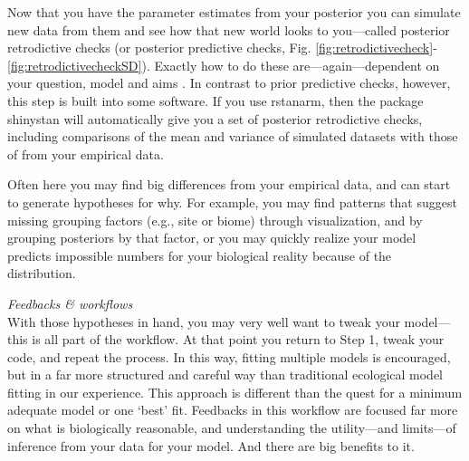 \documentclass[11pt]{article}
\begin{document}
{Now that you have the parameter estimates from your posterior you can simulate new data from them and see how that new world looks to you---called posterior retrodictive checks (or posterior predictive checks, Fig. \ref{fig:retrodictivecheck}-\ref{fig:retrodictivecheckSD}). Exactly how to do these are---again---dependent on your question, model and aims \citep[but there is lots written on this,][]{held2010,gelman200ppc,conn2018}. In contrast to prior predictive checks, however, this step is built into some software. If you use \textsf{rstanarm}, then the package \textsf{shinystan} will automatically give you a set of posterior retrodictive checks, including comparisons of the mean and variance of simulated datasets with those of from your empirical data. 

Often here you may find big differences from your empirical data, and can start to generate hypotheses for why. For example, you may find patterns that suggest missing grouping factors (e.g., site or biome) through visualization, and by grouping posteriors by that factor, or you may quickly realize your model predicts impossible numbers for your biological reality because of the distribution. 

\emph{Feedbacks \& workflows}\\
With those hypotheses in hand, you may very well want to tweak your model---this is all part of the workflow. At that point you return to Step 1, tweak your code, and repeat the process. In this way, fitting multiple models is encouraged, but in a far more structured and careful way than traditional ecological model fitting in our experience. This approach is different than the quest for a minimum adequate model or one `best' fit. Feedbacks in this workflow are focused far more on what is biologically reasonable, and understanding the utility---and limits---of inference from your data for your model.  And there are big benefits to it. 

}
\end{document}
